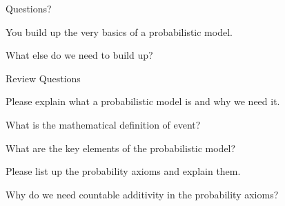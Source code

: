 \documentclass[fleqn,aspectratio=169]{beamer}
\begin{document}
\begin{frame}{}
\vspace{2cm}
\LARGE Questions?




\end{frame}

\begin{frame}{}
\vspace{2cm}


\medskip
\LARGE You build up the very basics of a probabilistic model. 

\medskip

\LARGE What else do we need to build up?
\end{frame}

\begin{frame}{Review Questions}
\bce[1)]
\item Please explain what a probabilistic model is and why we need it. 

\item What is the mathematical definition of event?

\item What are the key elements of the probabilistic model?

\item Please list up the probability axioms and explain them. 

\item Why do we need countable additivity in the probability axioms?

\ece
\end{frame}
\end{document}
